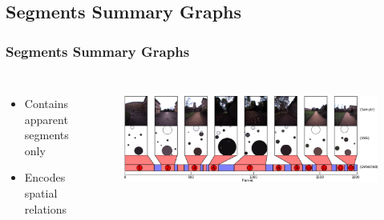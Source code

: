 \subsection{Segments Summary Graphs}
\frame
{
	\frametitle{Segments Summary Graphs}
	\begin{columns}[T]
		\begin{itemize}
			\item Contains apparent segments only
			\item Encodes spatial relations
		\end{itemize}
		\begin{figure}[p]
			\centering
			\includegraphics[width = 1.0\textwidth]{img/icsc/detected_places_nc.eps}
			\label{fig:ssg2}
		\end{figure}
	\end{columns}
	
}